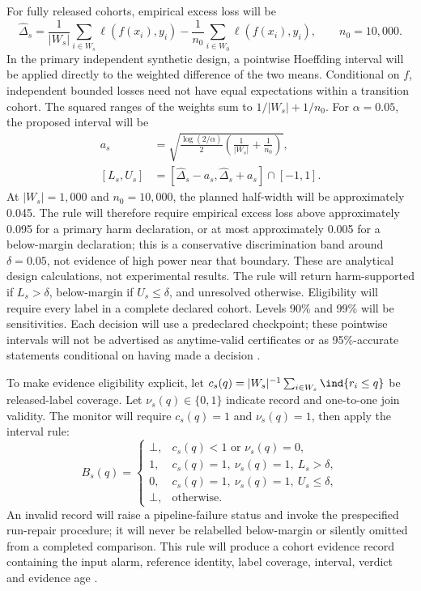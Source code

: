 For fully released cohorts, empirical excess loss will be
\begin{equation}
\widehat\Delta_s=\frac{1}{|W_s|}\sum_{i\in W_s}\ell(f(x_i),y_i)
-\frac{1}{n_0}\sum_{i\in W_0}\ell(f(x_i),y_i),\qquad n_0=10{,}000.
\end{equation}
In the primary independent synthetic design, a pointwise Hoeffding interval will be applied directly to the weighted difference of the two means. Conditional on $f$, independent bounded losses need not have equal expectations within a transition cohort. The squared ranges of the weights sum to $1/|W_s|+1/n_0$. For $\alpha=0.05$, the proposed interval will be
\begin{align}
a_s&=\sqrt{\frac{\log(2/\alpha)}{2}
\left(\frac{1}{|W_s|}+\frac{1}{n_0}\right)},\\
[L_s,U_s]&=[\widehat\Delta_s-a_s,\widehat\Delta_s+a_s]\cap[-1,1].
\end{align}
At $|W_s|=1{,}000$ and $n_0=10{,}000$, the planned half-width will be approximately 0.045. The rule will therefore require empirical excess loss above approximately 0.095 for a primary harm declaration, or at most approximately 0.005 for a below-margin declaration; this is a conservative discrimination band around $\delta=0.05$, not evidence of high power near that boundary. These are analytical design calculations, not experimental results. The rule will return harm-supported if $L_s>\delta$, below-margin if $U_s\leq\delta$, and unresolved otherwise. Eligibility will require every label in a complete declared cohort. Levels 90\% and 99\% will be sensitivities. Each decision will use a predeclared checkpoint; these pointwise intervals will not be advertised as anytime-valid certificates or as 95\%-accurate statements conditional on having made a decision \cite{hoeffding,selective}.

To make evidence eligibility explicit, let $c_s(q)=|W_s|^{-1}\sum_{i\in W_s}\ind\{r_i\leq q\}$ be released-label coverage. Let $\nu_s(q)\in\{0,1\}$ indicate record and one-to-one join validity. The monitor will require $c_s(q)=1$ and $\nu_s(q)=1$, then apply the interval rule:
\begin{equation}
B_s(q)=\begin{cases}
\bot,&c_s(q)<1\text{ or }\nu_s(q)=0,\\
1,&c_s(q)=1,\ \nu_s(q)=1,\ L_s>\delta,\\
0,&c_s(q)=1,\ \nu_s(q)=1,\ U_s\leq\delta,\\
\bot,&\text{otherwise}.
\end{cases}
\end{equation}
An invalid record will raise a pipeline-failure status and invoke the prespecified run-repair procedure; it will never be relabelled below-margin or silently omitted from a completed comparison. This rule will produce a cohort evidence record containing the input alarm, reference identity, label coverage, interval, verdict and evidence age \cite{awsjoin,alencar,nist}.

